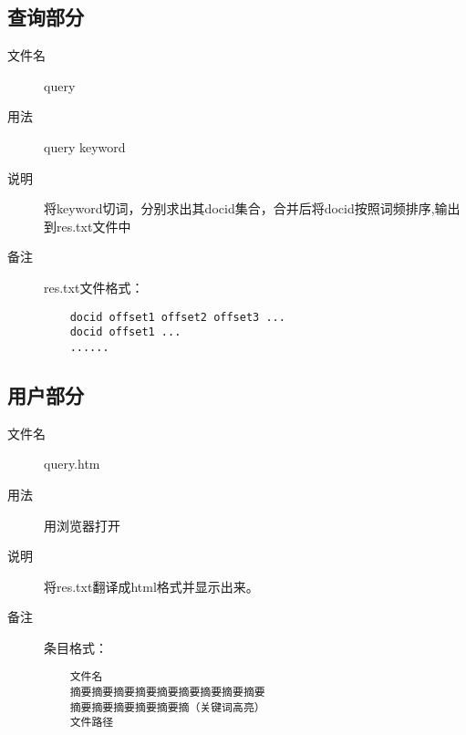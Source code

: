 \documentclass[14pt,a4paper]{article}
\begin{document}
\subsection{查询部分}
\begin{description}
\item[文件名] query
\item[用法] query keyword
\item[说明] 将keyword切词，分别求出其docid集合，合并后将docid按照词频排序,输出到res.txt文件中
\item[备注] res.txt文件格式：\\
  \begin{lstlisting}
    docid offset1 offset2 offset3 ...
    docid offset1 ...
    ......
  \end{lstlisting}
\end{description}
\subsection{用户部分}
\begin{description}
\item[文件名] query.htm
\item[用法] 用浏览器打开
\item[说明] 将res.txt翻译成html格式并显示出来。
\item[备注] 条目格式：\\
  \begin{verbatim}
    文件名    
    摘要摘要摘要摘要摘要摘要摘要摘要摘要
    摘要摘要摘要摘要摘要摘（关键词高亮）    
    文件路径
  \end{verbatim}
\end{description}
\end{document}
